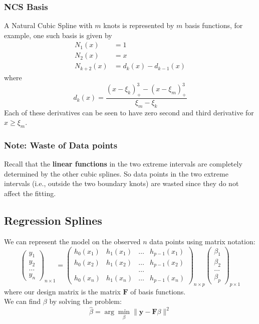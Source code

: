 \documentclass[11pt,a4paper]{article}
\begin{document}
\subsubsection{NCS Basis}
A Natural Cubic Spline with $m$ knots is represented by $m$ basis functions, for example, one such basis is given by
$$
\begin{aligned}
N_{1}(x) &=1 \\
N_{2}(x) &=x \\
N_{k+2}(x) &=d_{k}(x)-d_{k-1}(x)
\end{aligned}
$$
where
$$
d_{k}(x)=\frac{\left(x-\xi_{k}\right)_{+}^{3}-\left(x-\xi_{m}\right)_{+}^{3}}{\xi_{m}-\xi_{k}}
$$
Each of these derivatives can be seen to have zero second and third derivative for $x \geq \xi_{m}$.

\subsubsection{Note: Waste of Data points}
Recall that the \textbf{linear functions} in the two extreme intervals are completely determined by the other cubic splines. So data points in the two extreme intervals (i.e., outside the two boundary knots) are wasted since they do not affect the fitting.\\











\subsection{Regression Splines}
We can represent the model on the observed $n$ data points using matrix notation:
$$
\left(\begin{array}{l}
y_{1} \\
y_{2} \\
\ldots \\
y_{n}
\end{array}\right)_{n \times 1}=\left(\begin{array}{llll}
h_{0}\left(x_{1}\right) & h_{1}\left(x_{1}\right) & \ldots & h_{p-1}\left(x_{1}\right) \\
h_{0}\left(x_{2}\right) & h_{1}\left(x_{2}\right) & \ldots & h_{p-1}\left(x_{2}\right) \\
&&\ldots&\\
h_{0}\left(x_{n}\right) & h_{1}\left(x_{n}\right) & \ldots & h_{p-1}\left(x_{n}\right)
\end{array}\right)_{n \times p}\left(\begin{array}{l}
\beta_{1} \\
\beta_{2} \\
\ldots \\
\beta_{p}
\end{array}\right)_{p \times 1}
$$
where our design matrix is the matrix $\mathbf{F}$ of basis functions.\\
We can find $\beta$ by solving the problem:
$$
\hat{\beta}=\arg \min _{\beta}\|\mathbf{y}-\mathbf{F} \beta\|^{2}
$$
\end{document}
